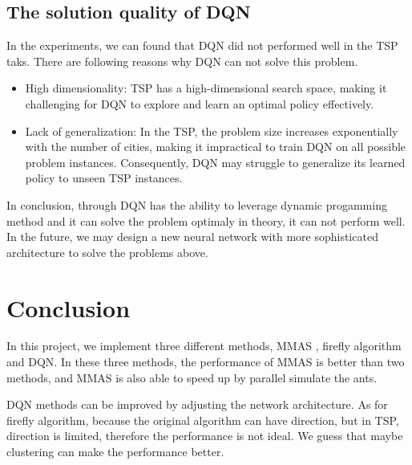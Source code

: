 \documentclass[twocolumn, a4paper]{extarticle}
\begin{document}
\subsection{The solution quality of DQN}

In the experiments, we can found that DQN did not performed well in the TSP taks. There are following reasons why DQN can not solve this problem.

\begin{itemize}
	\item High dimensionality: TSP has a high-dimensional search space, making it challenging for DQN to explore and learn an optimal policy effectively.
	\item Lack of generalization: In the TSP, the problem size increases exponentially with the number of cities, making it impractical to train DQN on all possible problem instances. Consequently, DQN may struggle to generalize its learned policy to unseen TSP instances.
\end{itemize}

In conclusion, through DQN has the ability to leverage dynamic progamming method and it can solve the problem optimaly in theory, it can not perform well. In the future, we may design a new neural network with more sophisticated architecture to solve the problems above. 



\section{Conclusion}

In this project, we implement three different methods, MMAS \cite{stutzle1999aco}, firefly algorithm\cite{jati2011evolutionary} and DQN\cite{mnih2013playing}. In these three methods, the performance of MMAS is better than two methods, and MMAS is also able to speed up by parallel simulate the ants. 

DQN methods can be improved by adjusting the network architecture. As for firefly algorithm, because the original algorithm can have direction, but in TSP, direction is limited, therefore the performance is not ideal. We guess that maybe clustering can make the performance better.


\printbibliography
\end{document}
